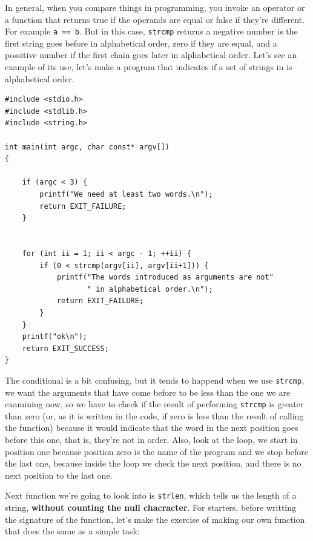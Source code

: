 \documentclass[a4paper]{article}
\begin{document}
In general, when you compare things in programming, you invoke an operator or
a function that returns true if the operands are equal or false if they're
different. For example \verb!a == b!. But in this case, \verb!strcmp! returns a
negative number is the first string goes before in alphabetical order, zero if
they are equal, and a possitive number if the first chain goes later in
alphabetical order. Let's see an example of its use, let's make a program that
indicates if a set of strings in is alphabetical order.

\noindent
\begin{minipage}[H]{\linewidth}
\mbox{}
\begin{lstlisting}[style=C,
caption={Example of use of \texttt{strcmp}},
label={lst:strcmp}]
#include <stdio.h>
#include <stdlib.h>
#include <string.h>

int main(int argc, char const* argv[])
{

    if (argc < 3) {
        printf("We need at least two words.\n");
        return EXIT_FAILURE;
    }


    for (int ii = 1; ii < argc - 1; ++ii) {
        if (0 < strcmp(argv[ii], argv[ii+1])) {
            printf("The words introduced as arguments are not"
                   " in alphabetical order.\n");
            return EXIT_FAILURE;
        }
    }
    printf("ok\n");
    return EXIT_SUCCESS;
}
\end{lstlisting}
\end{minipage}

The conditional is a bit confusing, but it tends to happend when we use
\verb!strcmp!, we want the arguments that have come before to be less than the
one we are examining now, so we have to check if the result of performing
\verb!strcmp! is greater than zero (or, as it is written in the code, if zero is
less than the result of calling the function) because it would indicate that
the word in the next position goes before this one, that is, they're not in
order. Also, look at the loop, we start in position one because position zero is
the name of the program and we stop before the last one, because inside the loop
we check the next position, and there is no next position to the last one.

Next function we're going to look into is \verb!strlen!, which tells us the
length of a string, \textbf{without counting the null chacracter}. For starters,
before writting the signature of the function, let's make the exercise of
making our own function that does the same as a simple task:
\end{document}
